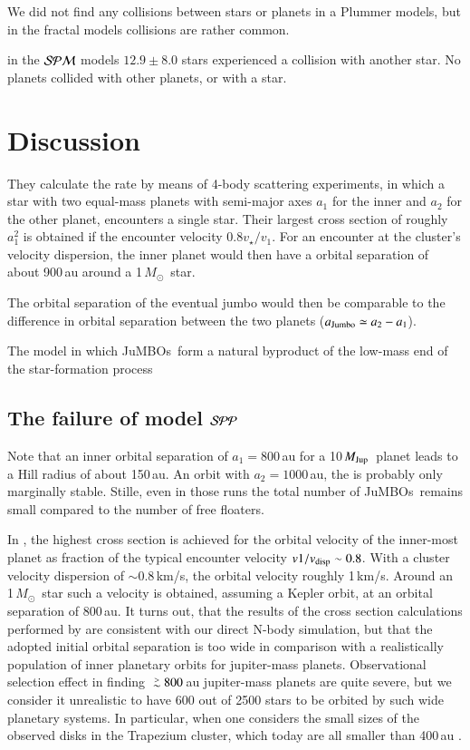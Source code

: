 \documentclass[aa]{lib/aa}
\newcommand{\MSun}{\mbox{${M}_\odot$}}
\newcommand{\MJup}{\mbox{${M}_{\rm Jup}$}}
\def\apgt{\ {\raise-.5ex\hbox{$\buildrel>\over\sim$}}\ }
\newcommand{\jumbos}{\mbox{JuMBOs}}
\begin{document}
We did not find any collisions between stars or planets in a Plummer
models, but in the fractal models collisions are rather common.

in the ${\cal SPM}$ models $12.9\pm8.0$ stars experienced a collision
with another star. No planets collided with other planets, or with a
star.


\section{Discussion}


They calculate the rate by means of 4-body scattering experiments, in
which a star with two equal-mass planets with semi-major axes $a_1$
for the inner and $a_2$ for the other planet, encounters a single
star. Their largest cross section of roughly $a_1^2$ is obtained if
the encounter velocity $0.8v_\star/v_1$. For an encounter at the
cluster's velocity dispersion, the inner planet would then have a
orbital separation of about 900\,au around a 1\,\MSun\, star.

The orbital separation of the eventual jumbo would then be comparable
to the difference in orbital separation between the two planets
($a_{\rm Jumbo} \simeq a_2-a_1$).

The model in which \jumbos\, form a natural byproduct of the low-mass
end of the star-formation process

\subsection{The failure of model ${\cal SPP}$}

Note that an inner orbital separation of $a_1=800$\,au for a
10\,\MJup\, planet leads to a Hill radius of about 150\,au. An orbit
with $a_2=1000$\,au, the is probably only marginally stable.  Stille,
even in those runs the total number of \jumbos\, remains small
compared to the number of free floaters.

In \cite{2023arXiv231006016W}, the highest cross section is achieved
for the orbital velocity of the inner-most planet as fraction of the
typical encounter velocity $v1/v_{\rm disp} \sim 0.8$. With a cluster
velocity dispersion of $\sim 0.8$\,km/s, the orbital velocity roughly
1\,km/s. Around an 1\,\MSun\, star such a velocity is obtained,
assuming a Kepler orbit, at an orbital separation of 800\,au. It turns
out, that the results of the cross section calculations performed by
\cite{2023arXiv231006016W} are consistent with our direct N-body
simulation, but that the adopted initial orbital separation is too
wide in comparison with a realistically population of inner planetary
orbits for jupiter-mass planets.  Observational selection effect in
finding $\apgt 800$\,au jupiter-mass planets are quite severe, but we
consider it unrealistic to have 600 out of 2500 stars to be orbited by
such wide planetary systems. In particular, when one considers the
small sizes of the observed disks in the Trapezium cluster, which
today are all smaller than 400\,au \citep{2005A&A...441..195V}.
\end{document}
